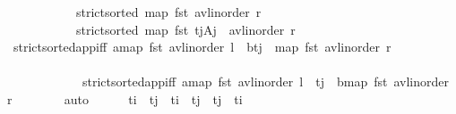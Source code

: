 \begin{isabellebody}
\ \ \ \ \ \ \ \ \ \ \ {\isachardoublequoteopen}strict{\isacharunderscore}{\kern0pt}sorted\ {\isacharparenleft}{\kern0pt}map\ fst\ {\isacharparenleft}{\kern0pt}avl{\isacharunderscore}{\kern0pt}inorder\ r{\isacharparenright}{\kern0pt}{\isacharparenright}{\kern0pt}{\isachardoublequoteclose}\isanewline
\ \ \ \ \ \ \ \ \ \ \ {\isachardoublequoteopen}strict{\isacharunderscore}{\kern0pt}sorted\ {\isacharparenleft}{\kern0pt}map\ fst\ {\isacharparenleft}{\kern0pt}{\isacharparenleft}{\kern0pt}t\isactrlsub j{\isacharcomma}{\kern0pt}A\isactrlsub j{\isacharparenright}{\kern0pt}\ {\isacharhash}{\kern0pt}\ avl{\isacharunderscore}{\kern0pt}inorder\ r{\isacharparenright}{\kern0pt}{\isacharparenright}{\kern0pt}{\isachardoublequoteclose}\isanewline
\ \ \ \ \ \ \isamarkupfalse%
\ strict{\isacharunderscore}{\kern0pt}sorted{\isacharunderscore}{\kern0pt}app{\isacharunderscore}{\kern0pt}iff{\isacharbrackleft}{\kern0pt}\ a{\isacharequal}{\kern0pt}{\isachardoublequoteopen}map\ fst\ {\isacharparenleft}{\kern0pt}avl{\isacharunderscore}{\kern0pt}inorder\ l{\isacharparenright}{\kern0pt}{\isachardoublequoteclose}\ \ b{\isacharequal}{\kern0pt}{\isachardoublequoteopen}t\isactrlsub j\ {\isacharhash}{\kern0pt}\ map\ fst\ {\isacharparenleft}{\kern0pt}avl{\isacharunderscore}{\kern0pt}inorder\ r{\isacharparenright}{\kern0pt}{\isachardoublequoteclose}{\isacharbrackright}{\kern0pt}\ \ \ \ \ \ \ \ \ \ \ \ \isanewline
\ \ \ \ \ \ \ \ \ \ \ \ strict{\isacharunderscore}{\kern0pt}sorted{\isacharunderscore}{\kern0pt}app{\isacharunderscore}{\kern0pt}iff{\isacharbrackleft}{\kern0pt}\ a{\isacharequal}{\kern0pt}{\isachardoublequoteopen}map\ fst\ {\isacharparenleft}{\kern0pt}avl{\isacharunderscore}{\kern0pt}inorder\ l{\isacharparenright}{\kern0pt}\ {\isacharat}{\kern0pt}\ {\isacharbrackleft}{\kern0pt}t\isactrlsub j{\isacharbrackright}{\kern0pt}{\isachardoublequoteclose}\ \ b{\isacharequal}{\kern0pt}{\isachardoublequoteopen}map\ fst\ {\isacharparenleft}{\kern0pt}avl{\isacharunderscore}{\kern0pt}inorder\ r{\isacharparenright}{\kern0pt}{\isachardoublequoteclose}{\isacharbrackright}{\kern0pt}\isanewline
\ \ \ \ \ \ \isamarkupfalse%
\ auto\isanewline
\ \ \ \ \isamarkupfalse%
\ {\isachardoublequoteopen}t\isactrlsub i\ {\isacharless}{\kern0pt}\ t\isactrlsub j\ {\isasymor}\ t\isactrlsub i\ {\isacharequal}{\kern0pt}\ t\isactrlsub j\ {\isasymor}\ t\isactrlsub j\ {\isacharless}{\kern0pt}\ t\isactrlsub i{\isachardoublequoteclose}\isanewline
\ \ \ \ \ \ \isamarkupfalse%

\end{isabellebody}
